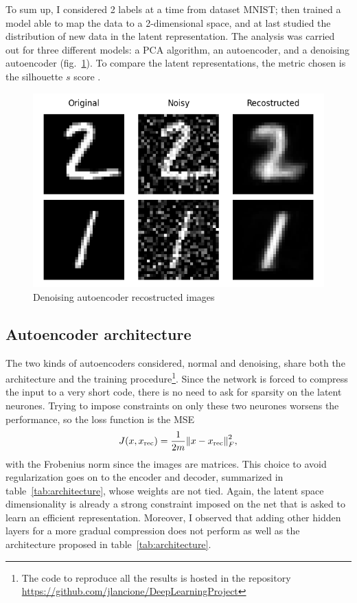 \documentclass[twocolumn,gsifonts,twoside]{gsipaper}
\begin{document}
To sum up, I considered 2 labels at a time from dataset MNIST; then trained a model able to map the data to a 2-dimensional space, and at last studied the distribution of new data in the latent representation. The analysis was carried out for three different models: a PCA algorithm, an autoencoder, and a denoising autoencoder (fig.~\ref{fig:denoising_ae}). To compare the latent representations, the metric chosen is the silhouette $s$ score \cite{Rousseeuw1987}. 
\begin{figure}
  \centering
  \includegraphics[width=.75\linewidth]{denoising_ae.png}
  \caption{Denoising autoencoder recostructed images}
  \label{fig:denoising_ae}
\end{figure}

\subsection{Autoencoder architecture}
The two kinds of autoencoders considered, normal and denoising, share both the architecture and the training procedure\footnote{The code to reproduce all the results is hosted in the repository \url{https://github.com/jlancione/DeepLearningProject}}. Since the network is forced to compress the input to a very short code, there is no need to ask for sparsity on the latent neurones. Trying to impose constraints on only these two neurones worsens the performance, so the loss function is the MSE
\[
J(x,x_\textup{rec}) = \frac{1}{2m}\norm{x - x_\textup{rec}}^2_F,
\]
with the Frobenius norm since the images are matrices. This choice to avoid regularization goes on to the encoder and decoder, summarized in table~\ref{tab:architecture}, whose weights are not tied. Again, the latent space dimensionality is already a strong constraint imposed on the net that is asked to learn an efficient representation. Moreover, I observed that adding other hidden layers for a more gradual compression does not perform as well as the architecture proposed in table~\ref{tab:architecture}.
\end{document}
